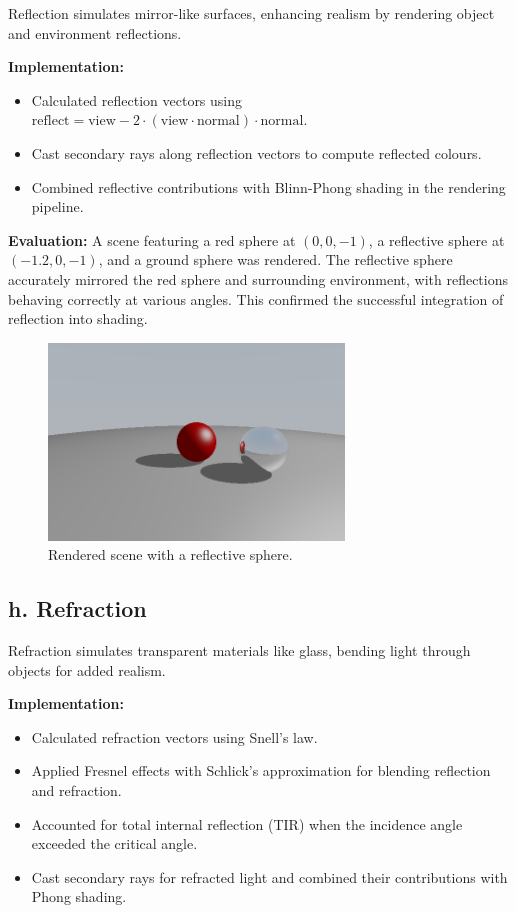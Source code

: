 \documentclass[11pt,a4paper]{article}
\begin{document}
Reflection simulates mirror-like surfaces, enhancing realism by rendering object and environment reflections.

\noindent\textbf{Implementation:}  
\begin{itemize}
    \item Calculated reflection vectors using \( \text{reflect} = \text{view} - 2 \cdot (\text{view} \cdot \text{normal}) \cdot \text{normal} \).  
    \item Cast secondary rays along reflection vectors to compute reflected colours.  
    \item Combined reflective contributions with Blinn-Phong shading in the rendering pipeline.  
\end{itemize}

\noindent\textbf{Evaluation:}  
A scene featuring a red sphere at \((0, 0, -1)\), a reflective sphere at \((-1.2, 0, -1)\), and a ground sphere was rendered. The reflective sphere accurately mirrored the red sphere and surrounding environment, with reflections behaving correctly at various angles. This confirmed the successful integration of reflection into shading.  

\begin{figure}[H]  
\centering  
\includegraphics[width=0.7\textwidth]{first_reflection.png}  
\caption{Rendered scene with a reflective sphere.}  
\label{fig:reflection}  
\end{figure}  

\subsection{h. Refraction}  
\label{sec:refraction}

Refraction simulates transparent materials like glass, bending light through objects for added realism.

\noindent\textbf{Implementation:}  
\begin{itemize}
    \item Calculated refraction vectors using Snell's law.  
    \item Applied Fresnel effects with Schlick's approximation for blending reflection and refraction.  
    \item Accounted for total internal reflection (TIR) when the incidence angle exceeded the critical angle.  
    \item Cast secondary rays for refracted light and combined their contributions with Phong shading.  
\end{itemize}
\end{document}
